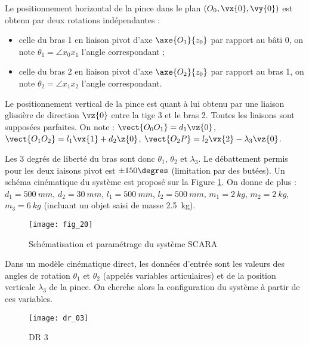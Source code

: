  Le positionnement horizontal de la pince dans le plan $\left(O_0,\vx{0},\vy{0}\right)$ est obtenu par deux rotations indépendantes : 
 \begin{itemize}
 \item celle du bras 1 en liaison pivot d'axe $\axe{O_1}{z_0}$ par rapport au bâti 0, on note $\theta_1 = \angle{x_0}{x_1}$ l'angle correspondant ;
 \item celle du bras 2 en liaison pivot d'axe $\axe{O_2}{z_0}$ par rapport au bras 1, on note $\theta_2 = \angle{x_1}{x_2}$ l'angle correspondant.
 \end{itemize}
 
Le positionnement vertical de la pince est quant à lui obtenu par une liaison glissière de direction
 $\vz{0}$ entre la tige 3 et le bras 2. 
Toutes les liaisons sont supposées parfaites.
On note : $\vect{O_0O_1} = d_1 \vz{0}$, 
$\vect{O_1O_2} = l_1 \vx{1}+d_2 \z{0}$, 
$\vect{O_2 P} =l_2\vx{2} - \lambda_3 \vz{0}$.

Les 3 degrés de liberté du bras sont donc $\theta_1$, $\theta_2$ et $\lambda_3$. Le débattement permis pour les deux iaisons pivot est $\pm 150\degres$ (limitation par des butées). 
Un schéma cinématique du système est proposé sur la Figure \ref{xens_2027_fig20}.
 On donne de plus :
 $d_1 =\SI{500}{mm}$, $d_2 =\SI{30}{mm}$, $l_1=\SI{500}{mm}$, $l_2 =\SI{500}{mm}$, 
$m_1 =\SI{2}{kg}$, $m_2=\SI{2}{kg}$, $m_3 =\SI{6}{kg}$ (incluant un objet saisi de masse \SI{2,5}{kg}).

\begin{figure}[!h]
\centering
\texttt{[image: fig\_20]}
\caption{Schématisation et paramétrage du système SCARA \label{xens_2027_fig20}}
\end{figure}




 Dans un modèle cinématique direct, les données d'entrée sont les valeurs des angles de rotation
$\theta_1$ et $\theta_2$ (appelés variables articulaires) et de la position verticale $\lambda_3$ de la pince. On cherche alors la configuration du système à partir de ces variables. 

 
\begin{figure}[!h]
\centering
\texttt{[image: dr\_03]}
\caption{DR 3 \label{xens_2027_dr03}}
\end{figure}

